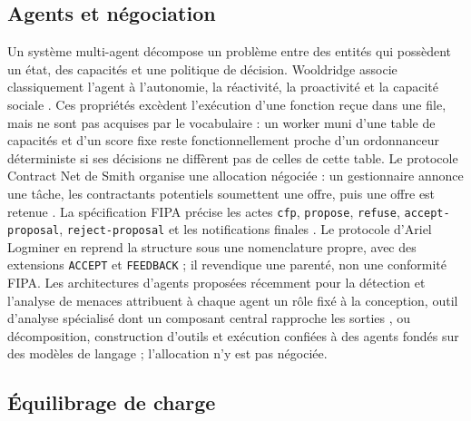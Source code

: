 \subsection{Agents et négociation}

Un système multi-agent décompose un problème entre des entités qui possèdent un état, des capacités et une politique de décision. Wooldridge associe classiquement l'agent à l'autonomie, la réactivité, la proactivité et la capacité sociale \cite{wooldridge2009introduction}. Ces propriétés excèdent l'exécution d'une fonction reçue dans une file, mais ne sont pas acquises par le vocabulaire : un worker muni d'une table de capacités et d'un score fixe reste fonctionnellement proche d'un ordonnanceur déterministe si ses décisions ne diffèrent pas de celles de cette table. Le protocole Contract Net de Smith organise une allocation négociée : un gestionnaire annonce une tâche, les contractants potentiels soumettent une offre, puis une offre est retenue \cite{smith1980contract}. La spécification FIPA précise les actes \texttt{cfp}, \texttt{propose}, \texttt{refuse}, \texttt{accept-proposal}, \texttt{reject-proposal} et les notifications finales \cite{fipa2002contractnet,fipa2002aclmessage,fipa2002cal}. Le protocole d'Ariel Logminer en reprend la structure sous une nomenclature propre, avec des extensions \texttt{ACCEPT} et \texttt{FEEDBACK} ; il revendique une parenté, non une conformité FIPA. Les architectures d'agents proposées récemment pour la détection et l'analyse de menaces attribuent à chaque agent un rôle fixé à la conception, outil d'analyse spécialisé dont un composant central rapproche les sorties \cite{hmimou2025multiagent}, ou décomposition, construction d'outils et exécution confiées à des agents fondés sur des modèles de langage \cite{song2024auditllm} ; l'allocation n'y est pas négociée.

\subsection{Équilibrage de charge}

